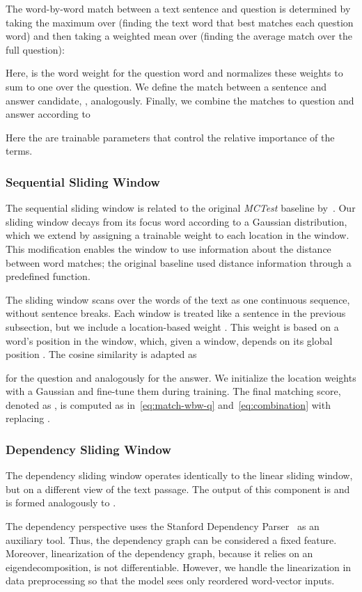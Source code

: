 \documentclass[11pt]{article}
\begin{document}
The word-by-word match between a text sentence and question is determined by taking the maximum over  (finding the text word that best matches each question word) and then taking a weighted mean over  (finding the average match over the full question):
 
Here,  is the word weight for the question word and  normalizes these weights to sum to one over the question.
We define the match between a sentence and answer candidate, , analogously. 
Finally, we combine the matches to question and answer according to

Here the  are trainable parameters that control the relative importance of the terms.

\subsubsection{Sequential Sliding Window}
The sequential sliding window is related to the original {\it MCTest} baseline by~. Our sliding window decays from its focus word according to a Gaussian distribution, which we extend by assigning a trainable weight to each location in the window. This modification enables the window to use information about the distance between word matches; the original baseline used distance information through a predefined function.

The sliding window scans over the words of the text as one continuous sequence, without sentence breaks.
Each window is treated like a sentence in the previous subsection, but we include a location-based weight . This weight is based on a word's position in the window, which, given a window, depends on its global position . The cosine similarity is adapted as

for the question and analogously for the answer. We initialize the location weights with a Gaussian and fine-tune them during training.
The final matching score, denoted as , is computed as in~\ref{eq:match-wbw-q} and~\ref{eq:combination} with  replacing .

\subsubsection{Dependency Sliding Window}
The dependency sliding window operates identically to the linear sliding window, but on a different view of the text passage. The output of this component is  and is formed analogously to .

The dependency perspective uses the Stanford Dependency Parser~\cite{chen2014} as an auxiliary tool. Thus, the dependency graph can be considered a fixed feature. Moreover, linearization of the dependency graph, because it relies on an eigendecomposition, is not differentiable. However, we handle the linearization in data preprocessing so that the model sees only reordered word-vector inputs. 
\end{document}

